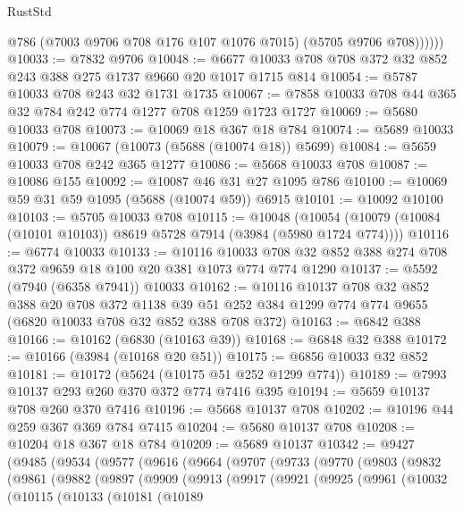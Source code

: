 \begin{lexlean}{RustStd}
\begin{coremodule}
              @786
              (@7003 @9706 @708 @176 @107 @1076 @7015)
              (@5705 @9706 @708))))))
@10033 := @7832 @9706
@10048 := @6677 @10033 @708 @708 @372 @32 @852 @243 @388 @275 @1737 @9660 @20 @1017 @1715 @814
@10054 := @5787 @10033 @708 @243 @32 @1731 @1735
@10067 := @7858 @10033 @708 @44 @365 @32 @784 @242 @774 @1277 @708 @1259 @1723 @1727
@10069 := @5680 @10033 @708
@10073 := @10069 @18 @367 @18 @784
@10074 := @5689 @10033
@10079 := @10067 (@10073 (@5688 (@10074 @18)) @5699)
@10084 := @5659 @10033 @708 @242 @365 @1277
@10086 := @5668 @10033 @708
@10087 := @10086 @155
@10092 := @10087 @46 @31 @27 @1095 @786
@10100 := @10069 @59 @31 @59 @1095 (@5688 (@10074 @59)) @6915
@10101 := @10092 @10100
@10103 := @5705 @10033 @708
@10115 := @10048
    (@10054 (@10079 (@10084 (@10101 @10103)) @8619 @5728 @7914 (@3984 (@5980 @1724 @774))))
@10116 := @6774 @10033
@10133 := @10116
    @10033
    @708
    @32
    @852
    @388
    @274
    @708
    @372
    @9659
    @18
    @100
    @20
    @381
    @1073
    @774
    @774
    @1290
@10137 := @5592 (@7940 (@6358 @7941)) @10033
@10162 := @10116
    @10137
    @708
    @32
    @852
    @388
    @20
    @708
    @372
    @1138
    @39
    @51
    @252
    @384
    @1299
    @774
    @774
    @9655
    (@6820 @10033 @708 @32 @852 @388 @708 @372)
@10163 := @6842 @388
@10166 := @10162 (@6830 (@10163 @39))
@10168 := @6848 @32 @388
@10172 := @10166 (@3984 (@10168 @20 @51))
@10175 := @6856 @10033 @32 @852
@10181 := @10172 (@5624 (@10175 @51 @252 @1299 @774))
@10189 := @7993 @10137 @293 @260 @370 @372 @774 @7416 @395
@10194 := @5659 @10137 @708 @260 @370 @7416
@10196 := @5668 @10137 @708
@10202 := @10196 @44 @259 @367 @369 @784 @7415
@10204 := @5680 @10137 @708
@10208 := @10204 @18 @367 @18 @784
@10209 := @5689 @10137
@10342 := @9427
    (@9485
      (@9534
        (@9577
          (@9616
            (@9664
              (@9707
                (@9733
                  (@9770
                    (@9803
                      (@9832
                        (@9861
                          (@9882
                            (@9897
                              (@9909
                                (@9913
                                  (@9917
                                    (@9921
                                      (@9925
                                        (@9961
                                          (@10032
                                            (@10115
                                              (@10133
                                                (@10181
                                                  (@10189

\end{coremodule}
\end{lexlean}
